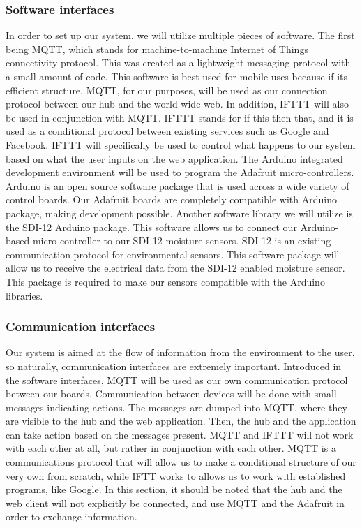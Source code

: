 \documentclass[onecolumn, draftclsnofoot,10pt, compsoc]{IEEEtran}
\begin{document}
	\subsubsection{Software interfaces}
	In order to set up our system, we will utilize multiple pieces of software.      
	The first being MQTT, which stands for machine-to-machine Internet of Things connectivity protocol.
	This was created as a lightweight messaging protocol with a small amount of code.   
	This software is best used for mobile uses because if its efficient structure.       
	MQTT, for our purposes, will be used as our connection protocol between our hub and the world wide web. 
	In addition, IFTTT will also be used in conjunction with MQTT. 
	IFTTT stands for if this then that, and it is used as a conditional protocol between existing services such as Google and Facebook.
	IFTTT will specifically be used to control what happens to our system based on what the user inputs on the web application. 
	The Arduino integrated development environment will be used to program the Adafruit micro-controllers.
	Arduino is an open source software package that is used across a wide variety of control boards.
	Our Adafruit boards are completely compatible with Arduino package, making development possible. 
	Another software library we will utilize is the SDI-12 Arduino package.
	This software allows us to connect our Arduino-based micro-controller to our SDI-12 moisture sensors. 
	SDI-12 is an existing communication protocol for environmental sensors. 
	This software package will allow us to receive the electrical data from the SDI-12 enabled moisture sensor.
	This package is required to make our sensors compatible with the Arduino libraries. 
	
	\subsubsection{Communication interfaces} Our system is aimed at the flow of information from the environment to the user, so naturally, communication interfaces are extremely important.
	Introduced in the software interfaces, MQTT will be used as our own communication protocol between our boards. 
	Communication between devices will be done with small messages indicating actions. 
	The messages are dumped into MQTT, where they are visible to the hub and the web application. 
	Then, the hub and the application can take action based on the messages present. 
	MQTT and IFTTT will not work with each other at all, but rather in conjunction with each other.
	MQTT is a communications protocol that will allow us to make a conditional structure of our very own from scratch, while IFTT works to allows us to work with established programs, like Google. 
	In this section, it should be noted that the hub and the web client will not explicitly be connected, and use MQTT and the Adafruit in order to exchange information.
	
\end{document}
